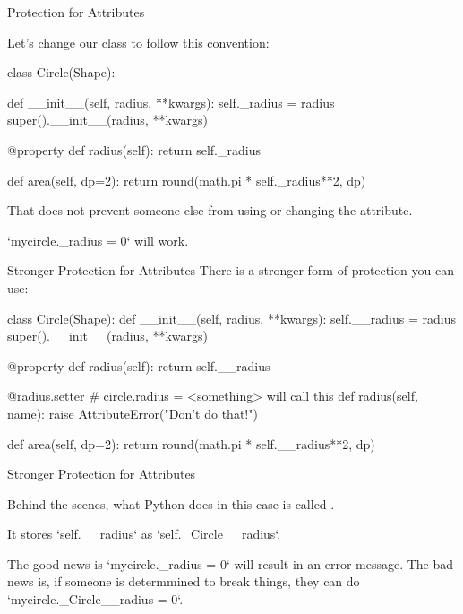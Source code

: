 \documentclass[aspectratio=169] {beamer}
\begin{document}
\begin{frame}[fragile]{Protection for Attributes}
  
   \small
  Let's change our  class to follow this convention:
 
  \begin{pythoncode}
    class Circle(Shape):

        def __init__(self, radius, **kwargs):
            self._radius = radius
            super().__init__(radius, **kwargs)

        @property
        def radius(self):
            return self._radius

        def area(self, dp=2):
            return round(math.pi * self._radius**2, dp)
  \end{pythoncode}

  That does not prevent someone else from using or changing the attribute.
  
  \inlineverb`mycircle._radius = 0` will work.
  
\end{frame}


\begin{frame}[fragile]{Stronger Protection for Attributes}
  \small
  There is a stronger form of protection you can use:
  
  \begin{pythoncode}
    class Circle(Shape):
        def __init__(self, radius, **kwargs):
            self.__radius = radius
            super().__init__(radius, **kwargs)

        @property
        def radius(self):
            return self.__radius

        @radius.setter # circle.radius = <something>  will call this 
        def radius(self, name):
            raise AttributeError("Don't do that!")

        def area(self, dp=2):
            return round(math.pi * self.__radius**2, dp)
  \end{pythoncode}
\end{frame}

\begin{frame}[fragile]{Stronger Protection for Attributes}
  
  Behind the scenes, what Python does in this case is called
  .
  
  \bigskip
  
  It stores \inlineverb`self.__radius` as \inlineverb`self._Circle__radius`.

  \bigskip \pause
  
  The good news is \inlineverb`mycircle._radius = 0` will result in an error message.
  The bad news is, if someone is determmined to break things, 
  they can do \inlineverb`mycircle._Circle__radius = 0`.
  
  
\end{frame}
\end{document}
